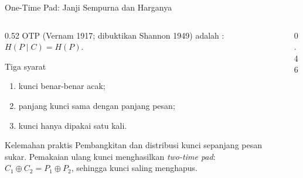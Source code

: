 \documentclass[aspectratio=169,11pt]{beamer}
\begin{document}
\begin{frame}{One-Time Pad: Janji Sempurna dan Harganya}
    \footnotesize
    \begin{columns}[T,onlytextwidth]
        \begin{column}{0.52\textwidth}
            OTP (Vernam 1917; dibuktikan Shannon 1949) adalah
            :
            $H(P \mid C)=H(P)$.
            \vspace{0.12cm}
            \begin{block}{Tiga syarat}
                \begin{enumerate}
                    \setlength{\itemsep}{1pt}
                    \item kunci benar-benar acak;
                    \item panjang kunci sama dengan panjang pesan;
                    \item kunci hanya dipakai satu kali.
                \end{enumerate}
            \end{block}
            \begin{alertblock}{Kelemahan praktis}
                Pembangkitan dan distribusi kunci sepanjang pesan sukar.
                Pemakaian ulang kunci menghasilkan \textit{two-time pad}:
                $C_1 \oplus C_2 = P_1 \oplus P_2$, sehingga kunci saling
                menghapus.
            \end{alertblock}
        \end{column}
        \begin{column}{0.46\textwidth}
            \centering
        \end{column}
    \end{columns}
\end{frame}
\end{document}
